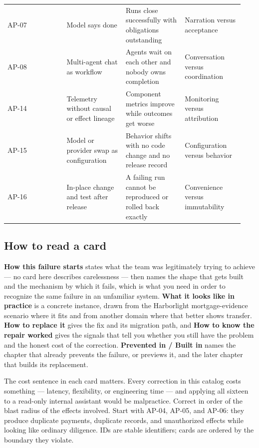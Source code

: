 \begin{longtable}{@{}Y{0.2350\linewidth}Y{0.2350\linewidth}Y{0.2350\linewidth}Y{0.2350\linewidth}@{}}
AP-07 & Model says done & Runs close successfully with obligations outstanding & Narration versus acceptance \\
AP-08 & Multi-agent chat as workflow & Agents wait on each other and nobody owns completion & Conversation versus coordination \\
AP-14 & Telemetry without causal or effect lineage & Component metrics improve while outcomes get worse & Monitoring versus attribution \\
AP-15 & Model or provider swap as configuration & Behavior shifts with no code change and no release record & Configuration versus behavior \\
AP-16 & In-place change and test after release & A failing run cannot be reproduced or rolled back exactly & Convenience versus immutability \\
\end{longtable}
\BookTableEnd

\subsection{How to read a card}

\textbf{How this failure starts} states what the team was legitimately trying to achieve — no card here describes carelessness — then names the shape that gets built and the mechanism by which it fails, which is what you need in order to recognize the same failure in an unfamiliar system. \textbf{What it looks like in practice} is a concrete instance, drawn from the Harborlight mortgage-evidence scenario where it fits and from another domain where that better shows transfer. \textbf{How to replace it} gives the fix and its migration path, and \textbf{How to know the repair worked} gives the signals that tell you whether you still have the problem and the honest cost of the correction. \textbf{Prevented in / Built in} names the chapter that already prevents the failure, or previews it, and the later chapter that builds its replacement.\par

The cost sentence in each card matters. Every correction in this catalog costs something — latency, flexibility, or engineering time — and applying all sixteen to a read-only internal assistant would be malpractice. Correct in order of the blast radius of the effects involved. Start with AP-04, AP-05, and AP-06: they produce duplicate payments, duplicate records, and unauthorized effects while looking like ordinary diligence. IDs are stable identifiers; cards are ordered by the boundary they violate.\par

